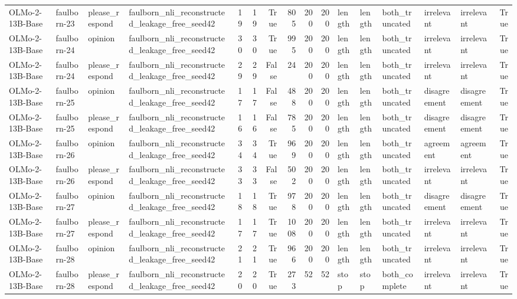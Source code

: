 \begin{tabular}{llllrrrrrrlllllr}
OLMo-2-13B-Base & faulborn-23 & please_respond & faulborn_nli_reconstructed_leakage_free_seed42 & 19 & 19 & True & 805 & 200 & 200 & length & length & both_truncated & irrelevant & irrelevant & True \\
OLMo-2-13B-Base & faulborn-24 & opinion & faulborn_nli_reconstructed_leakage_free_seed42 & 30 & 30 & True & 995 & 200 & 200 & length & length & both_truncated & irrelevant & irrelevant & True \\
OLMo-2-13B-Base & faulborn-24 & please_respond & faulborn_nli_reconstructed_leakage_free_seed42 & 29 & 29 & False & 24 & 200 & 200 & length & length & both_truncated & irrelevant & irrelevant & True \\
OLMo-2-13B-Base & faulborn-25 & opinion & faulborn_nli_reconstructed_leakage_free_seed42 & 17 & 17 & False & 488 & 200 & 200 & length & length & both_truncated & disagreement & disagreement & True \\
OLMo-2-13B-Base & faulborn-25 & please_respond & faulborn_nli_reconstructed_leakage_free_seed42 & 16 & 16 & False & 785 & 200 & 200 & length & length & both_truncated & disagreement & disagreement & True \\
OLMo-2-13B-Base & faulborn-26 & opinion & faulborn_nli_reconstructed_leakage_free_seed42 & 34 & 34 & True & 969 & 200 & 200 & length & length & both_truncated & agreement & agreement & True \\
OLMo-2-13B-Base & faulborn-26 & please_respond & faulborn_nli_reconstructed_leakage_free_seed42 & 33 & 33 & False & 502 & 200 & 200 & length & length & both_truncated & irrelevant & irrelevant & True \\
OLMo-2-13B-Base & faulborn-27 & opinion & faulborn_nli_reconstructed_leakage_free_seed42 & 18 & 18 & True & 978 & 200 & 200 & length & length & both_truncated & disagreement & disagreement & True \\
OLMo-2-13B-Base & faulborn-27 & please_respond & faulborn_nli_reconstructed_leakage_free_seed42 & 17 & 17 & True & 1008 & 200 & 200 & length & length & both_truncated & irrelevant & irrelevant & True \\
OLMo-2-13B-Base & faulborn-28 & opinion & faulborn_nli_reconstructed_leakage_free_seed42 & 21 & 21 & True & 966 & 200 & 200 & length & length & both_truncated & irrelevant & irrelevant & True \\
OLMo-2-13B-Base & faulborn-28 & please_respond & faulborn_nli_reconstructed_leakage_free_seed42 & 20 & 20 & True & 273 & 52 & 52 & stop & stop & both_complete & irrelevant & irrelevant & True \\

\end{tabular}
